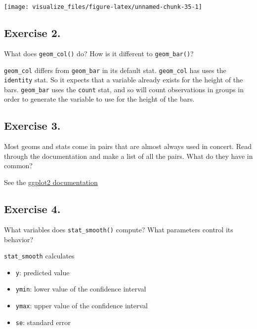 \documentclass[]{book}
\providecommand{\tightlist}{%
  \setlength{\itemsep}{0pt}\setlength{\parskip}{0pt}}
\theoremstyle{plain}
\theoremstyle{remark}
\theoremstyle{definition}
\theoremstyle{definition}
\theoremstyle{definition}
\theoremstyle{remark}
\begin{document}
\begin{center}\texttt{[image: visualize\_files/figure-latex/unnamed-chunk-35-1]} \end{center}

\hypertarget{exercise-2.-1}{%
\subsection{Exercise 2.}\label{exercise-2.-1}}

What does \texttt{geom\_col()} do? How is it different to
\texttt{geom\_bar()}?

\texttt{geom\_col} differs from \texttt{geom\_bar} in its default stat.
\texttt{geom\_col} has uses the \texttt{identity} stat. So it expects
that a variable already exists for the height of the bars.
\texttt{geom\_bar} uses the \texttt{count} stat, and so will count
observations in groups in order to generate the variable to use for the
height of the bars.

\hypertarget{exercise-3.-1}{%
\subsection{Exercise 3.}\label{exercise-3.-1}}

Most geoms and stats come in pairs that are almost always used in
concert. Read through the documentation and make a list of all the
pairs. What do they have in common?

See the \href{http://docs.ggplot2.org/current/}{ggplot2 documentation}

\hypertarget{exercise-4.-1}{%
\subsection{Exercise 4.}\label{exercise-4.-1}}

What variables does \texttt{stat\_smooth()} compute? What parameters
control its behavior?

\texttt{stat\_smooth} calculates

\begin{itemize}
\tightlist
\item
  \texttt{y}: predicted value
\item
  \texttt{ymin}: lower value of the confidence interval
\item
  \texttt{ymax}: upper value of the confidence interval
\item
  \texttt{se}: standard error
\end{itemize}
\end{document}
